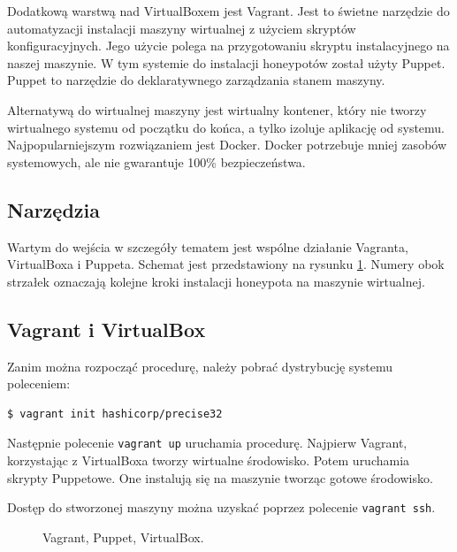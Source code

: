\documentclass[runningheads,a4paper]{llncs}
\begin{document}
Dodatkową warstwą nad VirtualBoxem jest Vagrant. Jest to świetne narzędzie do automatyzacji instalacji maszyny wirtualnej z użyciem skryptów konfiguracyjnych. Jego użycie polega na przygotowaniu skryptu instalacyjnego na naszej maszynie. W tym systemie do instalacji honeypotów został użyty Puppet. Puppet to narzędzie do deklaratywnego zarządzania stanem maszyny.

Alternatywą do wirtualnej maszyny jest wirtualny kontener, który nie tworzy wirtualnego systemu od początku do końca, a tylko izoluje aplikację od systemu. Najpopularniejszym rozwiązaniem jest Docker. Docker potrzebuje mniej zasobów systemowych, ale nie gwarantuje 100\% bezpieczeństwa.

\subsection{Narzędzia}

Wartym do wejścia w szczegóły tematem jest wspólne działanie Vagranta, VirtualBoxa i Puppeta. Schemat jest przedstawiony na rysunku \ref{fig:vagrant_fig}. Numery obok strzałek oznaczają kolejne kroki instalacji honeypota na maszynie wirtualnej.

\subsection*{Vagrant i VirtualBox}

Zanim można rozpocząć procedurę, należy pobrać dystrybucję systemu poleceniem:
\begin{lstlisting}
$ vagrant init hashicorp/precise32
\end{lstlisting}

Następnie polecenie \texttt{vagrant up} uruchamia procedurę. Najpierw Vagrant, korzystając z VirtualBoxa tworzy wirtualne środowisko. Potem uruchamia skrypty Puppetowe. One instalują się na maszynie tworząc gotowe środowisko.

Dostęp do stworzonej maszyny można uzyskać poprzez polecenie \texttt{vagrant ssh}.

\begin{figure}
        \centering
        \caption{Vagrant, Puppet, VirtualBox.}
        \label{fig:vagrant_fig}
\end{figure}
\end{document}
